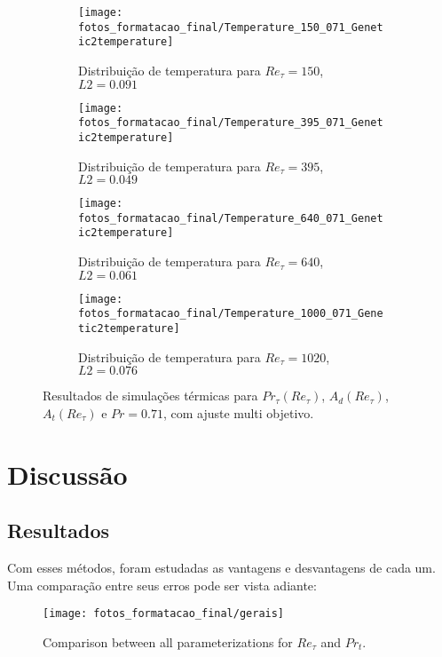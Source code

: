 \begin{figure*}[!h]
	\centering
	\begin{subfigure}[t]{0.5\textwidth}
		\centering
		\texttt{[image: fotos\_formatacao\_final/Temperature\_150\_071\_Genetic2temperature]}
		\caption{Distribuição de temperatura para $Re_\tau = 150$, $L2 = 0.091$}
	\end{subfigure}
	\begin{subfigure}[t]{0.45\textwidth}
		\centering
		\texttt{[image: fotos\_formatacao\_final/Temperature\_395\_071\_Genetic2temperature]}
		\caption{Distribuição de temperatura para $Re_\tau = 395$, $L2 = 0.049$}
	\end{subfigure}
	\begin{subfigure}[t]{0.5\textwidth}
		\centering
		\texttt{[image: fotos\_formatacao\_final/Temperature\_640\_071\_Genetic2temperature]}
		\caption{Distribuição de temperatura para $Re_\tau = 640$, $L2 = 0.061$}
	\end{subfigure}
	\begin{subfigure}[t]{0.45\textwidth}
		\centering
		\texttt{[image: fotos\_formatacao\_final/Temperature\_1000\_071\_Genetic2temperature]}
		\caption{Distribuição de temperatura para $Re_\tau = 1020$, $L2 = 0.076$}
	\end{subfigure}	
	\caption{Resultados de simulações térmicas para $Pr_\tau(Re_\tau)$, $A_d(Re_\tau)$, $A_t(Re_\tau) $ e $Pr =0.71$, com ajuste multi objetivo.}
	\vspace{-5mm}
\end{figure*}



\chapter{Discussão}


\section{Resultados}

Com esses métodos, foram estudadas as vantagens e desvantagens de cada um. Uma comparação entre seus erros pode ser vista adiante:\\

\begin{figure}[!h]
	\centering
	\texttt{[image: fotos\_formatacao\_final/gerais]}
	\caption{Comparison between all parameterizations for $Re_\tau$ and $Pr_t$.}
\end{figure}

